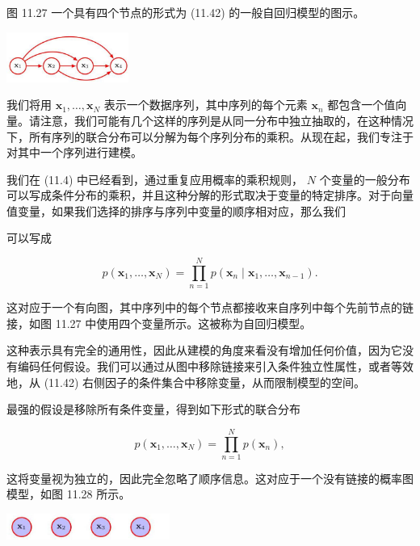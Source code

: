 \documentclass[10pt]{article}
\begin{document}
图 11.27 一个具有四个节点的形式为 (11.42) 的一般自回归模型的图示。

\begin{center}
\includegraphics[max width=0.3\textwidth]{images/0194e279-9b28-703a-88f4-c3ac21e2010d_369_1079_368_472_194_0.jpg}
\end{center}
\hspace*{3em} 

我们将用 \({\mathbf{x}}_{1},\ldots ,{\mathbf{x}}_{N}\) 表示一个数据序列，其中序列的每个元素 \({\mathbf{x}}_{n}\) 都包含一个值向量。请注意，我们可能有几个这样的序列是从同一分布中独立抽取的，在这种情况下，所有序列的联合分布可以分解为每个序列分布的乘积。从现在起，我们专注于对其中一个序列进行建模。

我们在 (11.4) 中已经看到，通过重复应用概率的乘积规则， \(N\) 个变量的一般分布可以写成条件分布的乘积，并且这种分解的形式取决于变量的特定排序。对于向量值变量，如果我们选择的排序与序列中变量的顺序相对应，那么我们

可以写成

\[
p\left( {{\mathbf{x}}_{1},\ldots ,{\mathbf{x}}_{N}}\right)  = \mathop{\prod }\limits_{{n = 1}}^{N}p\left( {{\mathbf{x}}_{n} \mid  {\mathbf{x}}_{1},\ldots ,{\mathbf{x}}_{n - 1}}\right) . \tag{11.42}
\]

这对应于一个有向图，其中序列中的每个节点都接收来自序列中每个先前节点的链接，如图 11.27 中使用四个变量所示。这被称为自回归模型。

这种表示具有完全的通用性，因此从建模的角度来看没有增加任何价值，因为它没有编码任何假设。我们可以通过从图中移除链接来引入条件独立性属性，或者等效地，从 (11.42) 右侧因子的条件集合中移除变量，从而限制模型的空间。

最强的假设是移除所有条件变量，得到如下形式的联合分布

\[
p\left( {{\mathbf{x}}_{1},\ldots ,{\mathbf{x}}_{N}}\right)  = \mathop{\prod }\limits_{{n = 1}}^{N}p\left( {\mathbf{x}}_{n}\right) , \tag{11.43}
\]

这将变量视为独立的，因此完全忽略了顺序信息。这对应于一个没有链接的概率图模型，如图 11.28 所示。

\begin{center}
\includegraphics[max width=0.4\textwidth]{images/0194e279-9b28-703a-88f4-c3ac21e2010d_370_938_346_535_86_0.jpg}
\end{center}
\hspace*{3em} 
\end{document}
